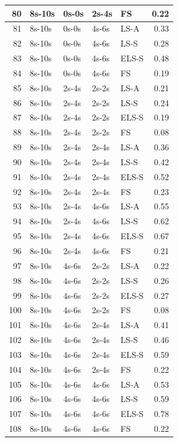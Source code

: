 \begin{table}[ht]
\begin{tabular}{rllllr}
  80 & 8s-10s & 0s-0s & 2s-4s & FS & 0.22 \\ 
  \hline
  81 & 8s-10s & 0s-0s & 4s-6s & LS-A & 0.33 \\ 
  82 & 8s-10s & 0s-0s & 4s-6s & LS-S & 0.28 \\ 
  83 & 8s-10s & 0s-0s & 4s-6s & ELS-S & 0.48 \\ 
  84 & 8s-10s & 0s-0s & 4s-6s & FS & 0.19 \\ 
  \hline
  85 & 8s-10s & 2s-4s & 2s-2s & LS-A & 0.21 \\ 
  86 & 8s-10s & 2s-4s & 2s-2s & LS-S & 0.24 \\ 
  87 & 8s-10s & 2s-4s & 2s-2s & ELS-S & 0.19 \\ 
  88 & 8s-10s & 2s-4s & 2s-2s & FS & 0.08 \\ 
  \hline
  89 & 8s-10s & 2s-4s & 2s-4s & LS-A & 0.36 \\ 
  90 & 8s-10s & 2s-4s & 2s-4s & LS-S & 0.42 \\ 
  91 & 8s-10s & 2s-4s & 2s-4s & ELS-S & 0.52 \\ 
  92 & 8s-10s & 2s-4s & 2s-4s & FS & 0.23 \\ 
  \hline
  93 & 8s-10s & 2s-4s & 4s-6s & LS-A & 0.55 \\ 
  94 & 8s-10s & 2s-4s & 4s-6s & LS-S & 0.62 \\ 
  95 & 8s-10s & 2s-4s & 4s-6s & ELS-S & 0.67 \\ 
  96 & 8s-10s & 2s-4s & 4s-6s & FS & 0.21 \\ 
  \hline
  97 & 8s-10s & 4s-6s & 2s-2s & LS-A & 0.22 \\ 
  98 & 8s-10s & 4s-6s & 2s-2s & LS-S & 0.26 \\ 
  99 & 8s-10s & 4s-6s & 2s-2s & ELS-S & 0.27 \\ 
  100 & 8s-10s & 4s-6s & 2s-2s & FS & 0.08 \\ 
  \hline
  101 & 8s-10s & 4s-6s & 2s-4s & LS-A & 0.41 \\ 
  102 & 8s-10s & 4s-6s & 2s-4s & LS-S & 0.46 \\ 
  103 & 8s-10s & 4s-6s & 2s-4s & ELS-S & 0.59 \\ 
  104 & 8s-10s & 4s-6s & 2s-4s & FS & 0.22 \\ 
  \hline
  105 & 8s-10s & 4s-6s & 4s-6s & LS-A & 0.53 \\ 
  106 & 8s-10s & 4s-6s & 4s-6s & LS-S & 0.59 \\ 
  107 & 8s-10s & 4s-6s & 4s-6s & ELS-S & 0.78 \\ 
  108 & 8s-10s & 4s-6s & 4s-6s & FS & 0.22 \\
   \hline
\end{tabular}
\end{table}